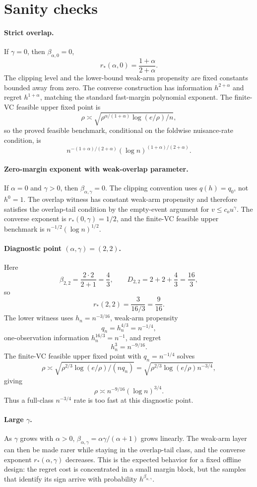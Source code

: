 \documentclass[11pt]{article}
\theoremstyle{definition}
\theoremstyle{plain}
\theoremstyle{remark}
\begin{document}
\section{Sanity checks}
\paragraph{Strict overlap.}
If \(\gamma=0\), then \(\beta_{\alpha,0}=0\),
\[
r_*(\alpha,0)=\frac{1+\alpha}{2+\alpha}.
\]
The clipping level and the lower-bound weak-arm propensity are fixed
constants bounded away from zero.  The converse construction has information
\(h^{2+\alpha}\) and regret \(h^{1+\alpha}\), matching the standard
fast-margin polynomial exponent.  The finite-VC feasible upper fixed point is
\[
\rho\asymp
\sqrt{\rho^{\alpha/(1+\alpha)}\log(e/\rho)/n},
\]
so the proved feasible benchmark, conditional on the foldwise nuisance-rate
condition, is
\[
n^{-(1+\alpha)/(2+\alpha)}
(\log n)^{(1+\alpha)/(2+\alpha)}.
\]

\paragraph{Zero-margin exponent with weak-overlap parameter.}
If \(\alpha=0\) and \(\gamma>0\), then
\(\beta_{\alpha,\gamma}=0\).  The clipping convention uses \(q(h)=q_0\),
not \(h^0=1\).  The overlap witness has constant weak-arm propensity and
therefore satisfies the overlap-tail condition by the empty-event argument
for \(v\le c_o u^\gamma\).  The converse exponent is
\(r_*(0,\gamma)=1/2\), and the finite-VC feasible upper benchmark is
\(n^{-1/2}(\log n)^{1/2}\).

\paragraph{Diagnostic point \((\alpha,\gamma)=(2,2)\).}
Here
\[
\beta_{2,2}=\frac{2\cdot2}{2+1}=\frac43,\qquad
D_{2,2}=2+2+\frac43=\frac{16}{3},
\]
so
\[
r_*(2,2)=\frac3{16/3}=\frac9{16}.
\]
The lower witness uses \(h_n=n^{-3/16}\), weak-arm propensity
\[
q_n=h_n^{4/3}=n^{-1/4},
\]
one-observation information \(h_n^{16/3}=n^{-1}\), and regret
\[
h_n^3=n^{-9/16}.
\]
The finite-VC feasible upper fixed point with \(q_n=n^{-1/4}\) solves
\[
\rho\asymp\sqrt{\rho^{2/3}\log(e/\rho)/(nq_n)}
=\sqrt{\rho^{2/3}\log(e/\rho)n^{-3/4}},
\]
giving
\[
\rho\asymp n^{-9/16}(\log n)^{3/4}.
\]
Thus a full-class \(n^{-3/4}\) rate is too fast at this diagnostic point.

\paragraph{Large \(\gamma\).}
As \(\gamma\) grows with \(\alpha>0\),
\(\beta_{\alpha,\gamma}=\alpha\gamma/(\alpha+1)\) grows linearly.  The
weak-arm layer can then be made rarer while staying in the overlap-tail
class, and the converse exponent \(r_*(\alpha,\gamma)\) decreases.  This is
the expected behavior for a fixed offline design: the regret cost is
concentrated in a small margin block, but the samples that identify its sign
arrive with probability \(h^{\beta_{\alpha,\gamma}}\).
\end{document}
